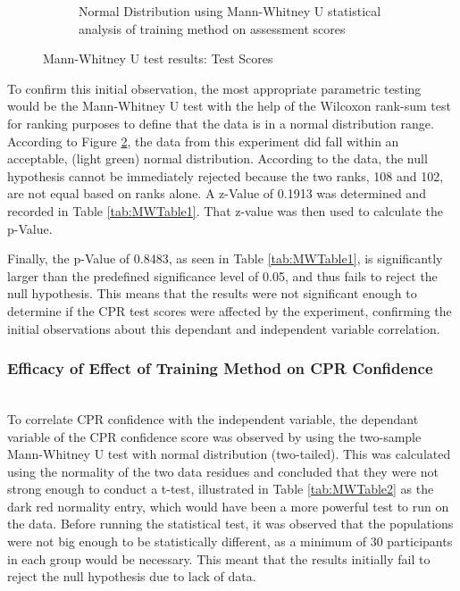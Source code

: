 \documentclass[manuscript]{./Models/acmart}
\begin{document}
\begin{figure}[!h]
\begin{subfigure}[b]{.4\textwidth}
        \caption{Normal Distribution using Mann-Whitney U statistical analysis of training method on assessment scores}
        \label{fig:VR vs VOT group MWU test}
    \end{subfigure}
    \caption{Mann-Whitney U test results: Test Scores}
\end{figure}

To confirm this initial observation, the most appropriate parametric testing would be the Mann-Whitney U test with the help of the Wilcoxon rank-sum test for ranking purposes to define that the data is in a normal distribution range. According to Figure \ref{fig:VR vs VOT group MWU test}, the data from this experiment did fall within an acceptable, (light green) normal distribution. According to the data, the null hypothesis cannot be immediately rejected because the two ranks, 108 and 102, are not equal based on ranks alone. A z-Value of 0.1913 was determined and recorded in Table \ref{tab:MWTable1}. That z-value was then used to calculate the p-Value.

Finally, the p-Value of 0.8483, as seen in Table \ref{tab:MWTable1}, is significantly larger than the predefined significance level of 0.05, and thus fails to reject the null hypothesis. This means that the results were not significant enough to determine if the CPR test scores were affected by the experiment, confirming the initial observations about this dependant and independent variable correlation.

\subsubsection{Efficacy of Effect of Training Method on CPR Confidence}
\hfill\\
To correlate CPR confidence with the independent variable, the dependant variable of the CPR confidence score was observed by using the two-sample Mann-Whitney U test with normal distribution (two-tailed). This was calculated using the normality of the two data residues and concluded that they were not strong enough to conduct a t-test, illustrated in Table \ref{tab:MWTable2} as the dark red normality entry, which would have been a more powerful test to run on the data. Before running the statistical test, it was observed that the populations were not big enough to be statistically different, as a minimum of 30 participants in each group would be necessary. This meant that the results initially fail to reject the null hypothesis due to lack of data. 
\end{document}
